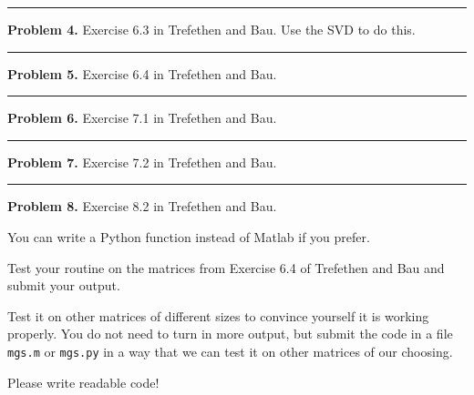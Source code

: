 \documentclass[10pt]{article}
\begin{document}


\vskip 1cm
\hrule
{\bf Problem 4.}
Exercise 6.3 in Trefethen and Bau.  Use the SVD to do this.





\vskip 1cm
\hrule
{\bf Problem 5.}
Exercise 6.4 in Trefethen and Bau.





\vskip 1cm
\hrule
{\bf Problem 6.}
Exercise 7.1 in Trefethen and Bau.




\vskip 1cm
\hrule
{\bf Problem 7.}
Exercise 7.2 in Trefethen and Bau.




\vskip 1cm
\hrule
{\bf Problem 8.}
Exercise 8.2 in Trefethen and Bau.  

You can write a Python function instead of Matlab if you prefer.  

Test your routine on the matrices from Exercise 6.4 of Trefethen and Bau  
and submit your output.

Test it on other matrices of different sizes to convince yourself it is
working properly. You do not need to turn in more output, but submit the
code in a file {\tt mgs.m} or {\tt mgs.py} in a way that we can test it on other
matrices of our choosing.

Please write readable code!



\end{document}
